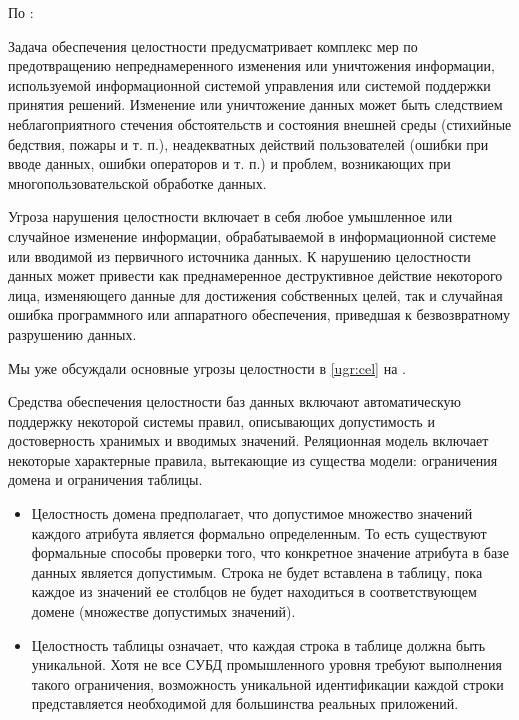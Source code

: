 По \autocite{Smirnov2007}:
\begin{grayquote}
	Задача обеспечения целостности предусматривает комплекс мер по предотвращению непреднамеренного изменения или унич­тожения информации, используемой информационной системой управления или системой поддержки принятия решений. Изменение или уничтожение данных может быть следствием неблагоприятного стечения обстоятельств и состояния внешней среды (стихийные бедствия, пожары и т. п.), неадекватных действий пользователей (ошибки при вводе данных, ошибки операторов и т. п.) и проблем, возникающих при многопользовательской обработке данных.

	Угроза нарушения целостности включает в себя любое умыш­ленное или случайное изменение информации, обрабатываемой в информационной системе или вводимой из первичного источника
	данных. К нарушению целостности данных может привести как преднамеренное деструктивное действие некоторого лица, изменяющего данные для достижения собственных целей, так и
	случайная ошибка программного или аппаратного обеспечения, приведшая к безвозвратному разрушению данных.
\end{grayquote}

Мы уже обсуждали основные угрозы целостности в \ref{ugr:cel} на \pageref{ugr:cel}.

Средства обеспечения целостности баз данных включают автоматическую поддержку некоторой системы правил, описывающих допустимость и достоверность хранимых и вводимых значений. Реляционная модель включает некоторые характерные правила, вытекающие из существа модели: ограничения домена и ограничения таблицы.
\begin{itemize}
	\item Целостность домена предполагает, что допустимое множество значений каждого атрибута является формально определенным. То есть существуют формальные способы проверки того, что конкретное значение атрибута в базе данных является допустимым. Строка не будет вставлена в таблицу, пока каждое из значений ее столбцов не будет находиться в соответствующем домене (множестве допустимых значений).
	\item Целостность таблицы означает, что каждая строка в таблице	должна быть уникальной. Хотя не все СУБД промышленного уровня требуют выполнения такого ограничения, возможность уникальной идентификации каждой строки представляется необходимой для большинства реальных приложений.
\end{itemize}

